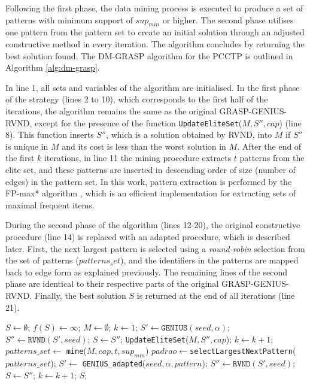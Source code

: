\documentclass{singlecol-new}
\begin{document}
Following the first phase, the data mining process is executed to produce a set of patterns with minimum support of $sup_{min}$ or higher. The second phase utilises one pattern from the pattern set to create an initial solution through an adjusted constructive method in every iteration. The algorithm concludes by returning the best solution found. The DM-GRASP algorithm for the PCCTP is outlined in Algorithm \ref{alg:dm-grasp}.

In line 1, all sets and variables of the algorithm are initialised. In the first phase of the strategy (lines 2 to 10), which corresponds to the first half of the iterations, the algorithm remains the same as the original GRASP-GENIUS-RVND, except for the presence of the function \texttt{UpdateEliteSet}($M, S'', cap$) (line 8). This function inserts $S''$, which is a solution obtained by RVND, into $M$ if $S''$ is unique in $M$ and its cost is less than the worst solution in $M$. After the end of the first $k$ iterations, in line 11 the mining procedure extracts $t$ patterns from the elite set, and these patterns are inserted in descending order of size (number of edges) in the pattern set. In this work, pattern extraction is performed by the FP-max* algorithm \cite{goethals04}, which is an efficient implementation for extracting sets of maximal frequent items.


During the second phase of the algorithm (lines 12-20), the original constructive procedure (line 14) is replaced with an adapted procedure, which is described later. First, the next largest pattern is selected using a \textit{round-robin} selection from the set of patterns ($patterns_set$), and the identifiers in the patterns are mapped back to edge form as explained previously. The remaining lines of the second phase are identical to their respective parts of the original GRASP-GENIUS-RVND. Finally, the best solution $S$ is returned at the end of all iterations (line 21).




\begin{algorithm}[!h]
	\caption{\hspace{-1mm}: \textbf{DM-GRASP}($maxIt, seed, t, cap, \alpha, sup_{min}$)}
	\label{alg:dm-grasp}
	{\footnotesize
		\begin{algorithmic}[1]		
			\STATE $S\gets \emptyset$; $f(S) \gets \infty$; $M \gets \emptyset$; $k \gets 1$; 
			\STATE $S' \gets \texttt{GENIUS} (seed, \alpha)$;  
			\STATE $S'' \gets \texttt{RVND} (S', seed)$; 
			\STATE $S \gets S''$;
			\ENDIF
			\STATE \texttt{UpdateEliteSet}($M, S'', cap$);
			\STATE $k \gets k +1$;
			\ENDWHILE
			\STATE	$patterns\_set \gets$ \texttt{mine}($M, cap, t, sup_{min}$)
			\STATE $padrao \gets $\texttt{selectLargestNextPattern}($patterns\_set$); 
			\STATE $S' \gets$ \texttt{GENIUS\_adapted}($seed, \alpha, pattern$);
			\STATE $S'' \gets \texttt{RVND} (S', seed)$;
			\STATE $S \gets S''$;
			\ENDIF
			\STATE $k \gets k +1$;
			\ENDWHILE
			\RETURN $S$;
		\end{algorithmic}
	}
\end{algorithm}
\end{document}
